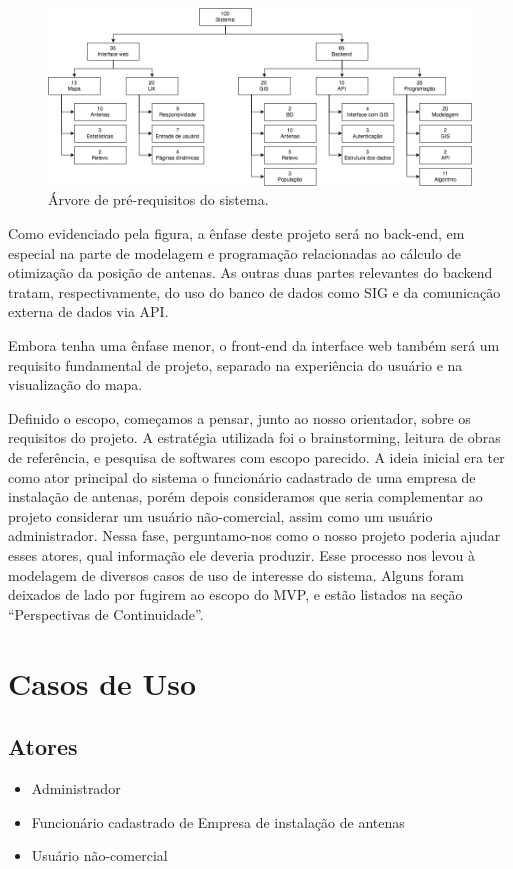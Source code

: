 \documentclass[]{politex}
\begin{document}
\begin{figure}[H]
  \centering
  \includegraphics[width=6in]{imagens/arvore_prerequisitos}
  \caption{Árvore de pré-requisitos do sistema.}
  \label{fig:arvore_prerequisitos}
\end{figure}

Como evidenciado pela figura, a ênfase deste projeto será no back-end, em
especial na parte de modelagem e programação relacionadas ao cálculo de
otimização da posição de antenas. As outras duas partes relevantes do
backend tratam, respectivamente, do uso do banco de dados como SIG e da
comunicação externa de dados via API.

Embora tenha uma ênfase menor, o front-end da interface web também será
um requisito fundamental de projeto, separado na experiência do usuário e na
visualização do mapa.

Definido o escopo, começamos a pensar, junto ao nosso orientador, sobre os
requisitos do projeto. A estratégia utilizada foi o brainstorming, leitura de
obras de referência, e pesquisa de softwares com escopo parecido.
A ideia inicial era ter como ator principal do sistema o funcionário cadastrado
de uma empresa de instalação de antenas, porém depois consideramos que seria
complementar ao projeto considerar um usuário não-comercial, assim
como um usuário administrador. Nessa fase, perguntamo-nos como o nosso projeto
poderia ajudar esses atores, qual informação ele deveria produzir. Esse processo
nos levou à modelagem de diversos casos de uso de interesse do sistema. Alguns
foram deixados de lado por fugirem ao escopo do MVP, e estão listados na seção
``Perspectivas de Continuidade''.

\section{Casos de Uso}
\subsection{Atores}
\begin{itemize}
\item Administrador
\item Funcionário cadastrado de Empresa de instalação de antenas
\item Usuário não-comercial
\end{itemize}
\end{document}
